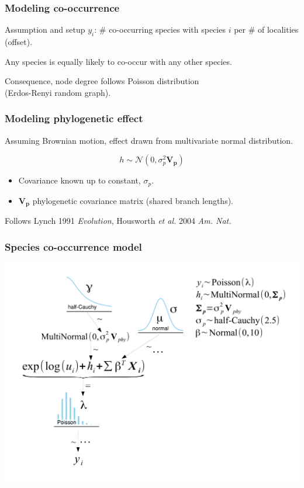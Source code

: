 \documentclass{beamer}
\begin{document}
\begin{frame}
  \frametitle{Modeling co-occurrence}
  \begin{alertblock}{Assumption and setup}
    \(y_{i}\): \# co-occurring species with species \(i\) per \# of localities (offset).

    Any species is equally likely to co-occur with any other species.

    Consequence, node degree follows Poisson distribution \\(Erdos-Renyi random graph).
  \end{alertblock}
\end{frame}

\begin{frame}
  \frametitle{Modeling phylogenetic effect}
  \begin{definition}
    Assuming Brownian motion, effect drawn from multivariate normal distribution.

    \begin{equation*}
      h \sim \mathcal{N}(0, \sigma_{p}^{2}\mathbf{V_{p}})
    \end{equation*}

    \begin{itemize}
      \item Covariance known up to constant, \(\sigma_{p}\).
      \item \(\mathbf{V_{p}}\) phylogenetic covariance matrix (shared branch lengths).
    \end{itemize}

    \tiny{Follows Lynch 1991 \textit{Evolution}, Housworth \textit{et al.} 2004 \textit{Am. Nat.}}
  \end{definition}
\end{frame}

\begin{frame}
  \frametitle{Species co-occurrence model}
  \begin{center}
    \includegraphics[height = 0.8\textheight, width = \textwidth,  keepaspectratio = true]{figure/mammal_degree_model}
  \end{center}
\end{frame}
\end{document}
